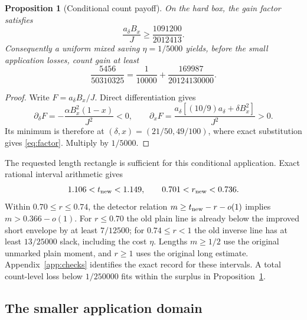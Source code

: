 \documentclass[11pt]{article}
\newtheorem{proposition}[theorem]{Proposition}
\theoremstyle{definition}
\theoremstyle{remark}
\numberwithin{equation}{section}
\begin{document}
\begin{proposition}[Conditional count payoff]\label{prop:payoff}
On the hard box, the gain factor satisfies
\begin{equation}\label{eq:factor}
\frac{a_\delta B_x}{J}\ge\frac{1091200}{2012413}.
\end{equation}
Consequently a uniform mixed saving $\eta=1/5000$ yields, before
the small application losses, count gain at least
\[
\frac{5456}{50310325}
=\frac1{10000}+\frac{169987}{20124130000}.
\]
\end{proposition}
\begin{proof}
Write $F=a_\delta B_x/J$. Direct differentiation gives
\[
\partial_\delta F
=-\frac{\alpha B_x^2(1-x)}{J^2}<0,\qquad
\partial_xF=\frac{a_\delta[(10/9)a_\delta+\delta B_x^2]}{J^2}>0.
\]
Its minimum is therefore at
$(\delta,x)=(21/50,49/100)$, where exact substitution gives
\eqref{eq:factor}. Multiply by $1/5000$.
\end{proof}

The requested length rectangle is sufficient for this conditional
application. Exact rational interval arithmetic gives
\[
1.106<t_{\rm new}<1.149,\qquad
0.701<r_{\rm new}<0.736.
\]
Within $0.70\le r\le0.74$, the detector relation
$m\ge t_{\rm new}-r-o(1)$ implies $m>0.366-o(1)$.
For $r\le0.70$ the old plain line is already below the improved
short envelope by at least $7/12500$; for
$0.74\le r<1$ the old inverse line has at least $13/25000$ slack,
including the cost $\eta$. Lengths $m\ge1/2$ use the original
unmarked plain moment, and $r\ge1$ uses the original long estimate.
Appendix~\ref{app:checks} identifies the exact record for these
intervals. A total count-level loss below $1/250000$ fits within
the surplus in Proposition~\ref{prop:payoff}.

\subsection{The smaller application domain}\label{sec:application-wedge}
\end{document}
